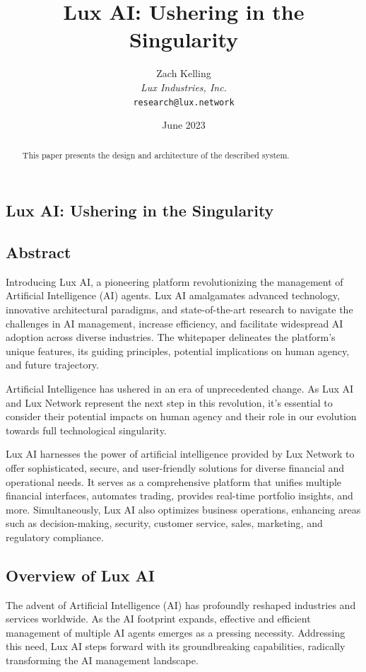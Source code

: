 \documentclass[11pt]{article}
\title{Lux AI: Ushering in the Singularity}
\author{Zach Kelling\\\textit{Lux Industries, Inc.}\\\texttt{research@lux.network}}
\date{June 2023}
\begin{document}
\luxcoverpage

\begin{abstract}
This paper presents the design and architecture of the described system.
\end{abstract}

\tableofcontents
\newpage


\subsection{Lux AI: Ushering in the Singularity}

\subsection{Abstract}

Introducing Lux AI, a pioneering platform revolutionizing the management of Artificial Intelligence (AI) agents. Lux AI amalgamates advanced technology, innovative architectural paradigms, and state-of-the-art research to navigate the challenges in AI management, increase efficiency, and facilitate widespread AI adoption across diverse industries. The whitepaper delineates the platform's unique features, its guiding principles, potential implications on human agency, and future trajectory.


Artificial Intelligence has ushered in an era of unprecedented change. As Lux AI and Lux Network represent the next step in this revolution, it's essential to consider their potential impacts on human agency and their role in our evolution towards full technological singularity.


Lux AI harnesses the power of artificial intelligence provided by Lux Network to offer sophisticated, secure, and user-friendly solutions for diverse financial and operational needs. It serves as a comprehensive platform that unifies multiple financial interfaces, automates trading, provides real-time portfolio insights, and more. Simultaneously, Lux AI also optimizes business operations, enhancing areas such as decision-making, security, customer service, sales, marketing, and regulatory compliance.


\subsection{Overview of Lux AI}

The advent of Artificial Intelligence (AI) has profoundly reshaped industries and services worldwide. As the AI footprint expands, effective and efficient management of multiple AI agents emerges as a pressing necessity. Addressing this need, Lux AI steps forward with its groundbreaking capabilities, radically transforming the AI management landscape.
\end{document}
